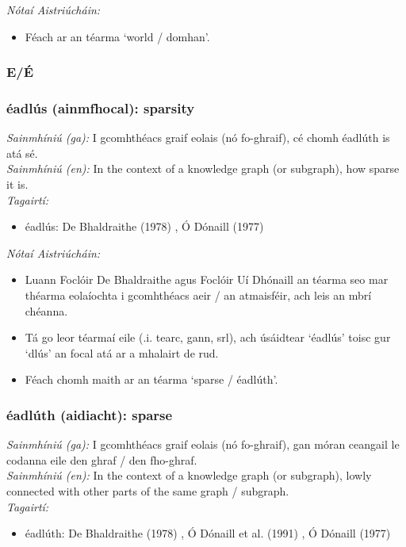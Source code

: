  \noindent \textit{Nótaí Aistriúcháin:}
\begin{itemize}
	\item Féach ar an téarma `world / domhan'.
\end{itemize}


 \subsubsection*{E/É}

\subsubsection*{éadlús (ainmfhocal): sparsity}
 \noindent \textit{Sainmhíniú (ga):} I gcomhthéacs graif eolais (nó fo-ghraif), cé chomh éadlúth is atá sé.
\\
 \noindent \textit{Sainmhíniú (en):} In the context of a knowledge graph (or subgraph), how sparse it is.
\\
 \noindent \textit{Tagairtí:}
\begin{itemize}
	\item éadlús: De Bhaldraithe (1978) \cite{de-bhaldraithe}, Ó Dónaill (1977) \cite{odonaill}
\end{itemize}

 \noindent \textit{Nótaí Aistriúcháin:}
\begin{itemize}
	\item Luann Foclóir De Bhaldraithe agus Foclóir Uí Dhónaill an téarma seo  mar théarma eolaíochta i gcomhthéacs aeir / an atmaisféir, ach leis an mbrí chéanna.
	\item Tá go leor téarmaí eile (.i. tearc, gann, srl), ach úsáidtear `éadlús' toisc gur `dlús' an focal atá ar a mhalairt de rud.
	\item Féach chomh maith ar an téarma `sparse / éadlúth'.
\end{itemize}


\subsubsection*{éadlúth (aidiacht): sparse}
 \noindent \textit{Sainmhíniú (ga):} I gcomhthéacs graif eolais (nó fo-ghraif), gan móran ceangail le codanna eile den ghraf / den fho-ghraf.
\\
 \noindent \textit{Sainmhíniú (en):} In the context of a knowledge graph (or subgraph), lowly connected with other parts of the same graph / subgraph.
\\
 \noindent \textit{Tagairtí:}
\begin{itemize}
	\item éadlúth: De Bhaldraithe (1978) \cite{de-bhaldraithe}, Ó Dónaill et al. (1991) \cite{focloir-beag}, Ó Dónaill (1977) \cite{odonaill}
\end{itemize}

